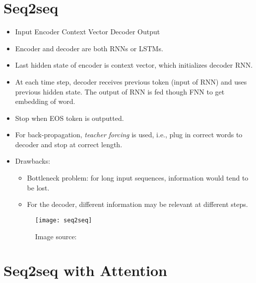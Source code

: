 \section{Seq2seq}

\begin{itemize}
\item 
Input \textrightarrow{} Encoder \textrightarrow{} Context Vector \textrightarrow{} Decoder \textrightarrow{} Output

\item 
Encoder and decoder are both RNNs or LSTMs.

\item 
Last hidden state of encoder is context vector, which initializes decoder RNN.

\item 
At each time step, decoder receives previous token (input of RNN) and uses previous hidden state. The output of RNN is fed though FNN to get embedding of word.

\item 
Stop when EOS token is outputted.

\item 
For back-propagation, \textit{teacher forcing} is used, i.e., plug in correct words to decoder and stop at correct length.

\item Drawbacks:
\begin{itemize}
\item 
Bottleneck problem: for long input sequences, information would tend to be lost.

\item 
For the decoder, different information may be relevant at different steps.
\end{itemize}
\begin{figure}[ht]
	\centering
	\texttt{[image: seq2seq]}
	\caption*{Image source: \cite{seq2seq_eddy}}
\end{figure}
\end{itemize}

\section{Seq2seq with Attention}


